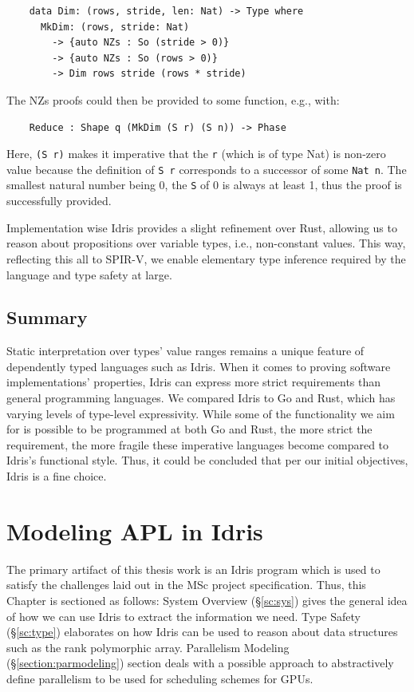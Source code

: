 \documentclass{report}
\begin{document}
\begin{verbatim}
    data Dim: (rows, stride, len: Nat) -> Type where
      MkDim: (rows, stride: Nat)
        -> {auto NZs : So (stride > 0)}
        -> {auto NZs : So (rows > 0)}
        -> Dim rows stride (rows * stride)
\end{verbatim}

The NZs proofs could then be provided to some function, e.g., with:

\begin{verbatim}
    Reduce : Shape q (MkDim (S r) (S n)) -> Phase
\end{verbatim}

Here, \verb|(S r)| makes it imperative that the \verb|r| (which is of type Nat) is non-zero value because the definition of \verb|S r| corresponds to a successor of some \verb|Nat n|. The smallest natural number being 0, the \verb|S| of 0 is always at least 1, thus the proof is successfully provided.

Implementation wise Idris provides a slight refinement over Rust, allowing us to reason about propositions over variable types, i.e., non-constant values. This way, reflecting this all to SPIR-V, we enable elementary type inference required by the language and type safety at large.

\section*{Summary}

Static interpretation over types' value ranges remains a unique feature of dependently typed languages such as Idris. When it comes to proving software implementations' properties, Idris can express more strict requirements than general programming languages. We compared Idris to Go and Rust, which has varying levels of type-level expressivity. While some of the functionality we aim for is possible to be programmed at both Go and Rust, the more strict the requirement, the more fragile these imperative languages become compared to Idris's functional style. Thus, it could be concluded that per our initial objectives, Idris is a fine choice.

\chapter{Modeling APL in Idris}
\label{ch:contribution}

The primary artifact of this thesis work is an Idris program which is used to satisfy the challenges laid out in the MSc project specification. Thus, this Chapter is sectioned as follows: System Overview (§\ref{sc:sys}) gives the general idea of how we can use Idris to extract the information we need. Type Safety (§\ref{sc:type}) elaborates on how Idris can be used to reason about data structures such as the rank polymorphic array. Parallelism Modeling (§\ref{section:parmodeling}) section deals with a possible approach to abstractively define parallelism to be used for scheduling schemes for GPUs.
\end{document}
